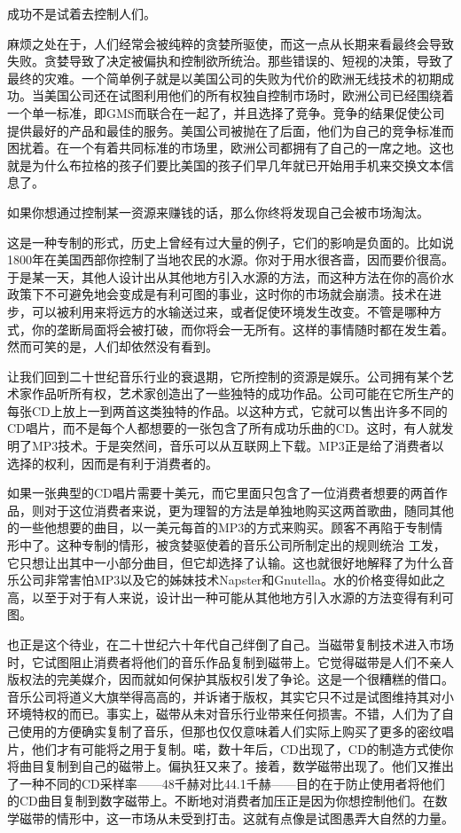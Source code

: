 成功不是试着去控制人们。

麻烦之处在于，人们经常会被纯粹的贪婪所驱使，而这一点从长期来看最终会导致失败。贪婪导致了决定被偏执和控制欲所统治。那些错误的、短视的决策，导致了最终的灾难。一个简单例子就是以美国公司的失败为代价的欧洲无线技术的初期成功。当美国公司还在试图利用他们的所有权独自控制市场时，欧洲公司已经围绕着一个单一标准，即GMS而联合在一起了，并且选择了竞争。竞争的结果促使公司提供最好的产品和最佳的服务。美国公司被抛在了后面，他们为自己的竞争标准而困扰着。在一个有着共同标准的市场里，欧洲公司都拥有了自己的一席之地。这也就是为什么布拉格的孩子们要比美国的孩子们早几年就已开始用手机来交换文本信息了。

如果你想通过控制某一资源来赚钱的话，那么你终将发现自己会被市场淘汰。

这是一种专制的形式，历史上曾经有过大量的例子，它们的影响是负面的。比如说1800年在美国西部你控制了当地农民的水源。你对于用水很吝啬，因而要价很高。于是某一天，其他人设计出从其他地方引入水源的方法，而这种方法在你的高价水政策下不可避免地会变成是有利可图的事业，这时你的市场就会崩溃。技术在进步，可以被利用来将远方的水输送过来，或者促使环境发生改变。不管是哪种方式，你的垄断局面将会被打破，而你将会一无所有。这样的事情随时都在发生着。然而可笑的是，人们却依然没有看到。

让我们回到二十世纪音乐行业的衰退期，它所控制的资源是娱乐。公司拥有某个艺术家作品听所有权，艺术家创造出了一些独特的成功作品。公司可能在它所生产的每张CD上放上一到两首这类独特的作品。以这种方式，它就可以售出许多不同的CD唱片，而不是每个人都想要的一张包含了所有成功乐曲的CD。这时，有人就发明了MP3技术。于是突然间，音乐可以从互联网上下载。MP3正是给了消费者以选择的权利，因而是有利于消费者的。

如果一张典型的CD唱片需要十美元，而它里面只包含了一位消费者想要的两首作品，则对于这位消费者来说，更为理智的方法是单独地购买这两首歌曲，随同其他的一些他想要的曲目，以一美元每首的MP3的方式来购买。顾客不再陷于专制情形中了。这种专制的情形，被贪婪驱使着的音乐公司所制定出的规则统治 工发，它只想让出其中一小部分曲目，但它却选择了认输。这也就很好地解释了为什么音乐公司非常害怕MP3以及它的姊妹技术Napster和Gnutella。水的价格变得如此之高，以至于对于有人来说，设计出一种可能从其他地方引入水源的方法变得有利可图。

也正是这个待业，在二十世纪六十年代自己绊倒了自己。当磁带复制技术进入市场时，它试图阻止消费者将他们的音乐作品复制到磁带上。它觉得磁带是人们不亲人版权法的完美媒介，因而就如何保护其版权引发了争论。这是一个很糟糕的借口。音乐公司将道义大旗举得高高的，并诉诸于版权，其实它只不过是试图维持其对小环境特权的而已。事实上，磁带从未对音乐行业带来任何损害。不错，人们为了自己使用的方便确实复制了音乐，但那也仅仅意味着人们实际上购买了更多的密纹唱片，他们才有可能将之用于复制。喏，数十年后，CD出现了，CD的制造方式使你将曲目复制到自己的磁带上。偏执狂又来了。接着，数学磁带出现了。他们又推出了一种不同的CD采样率——48千赫对比44.1千赫——目的在于防止使用者将他们的CD曲目复制到数字磁带上。不断地对消费者加压正是因为你想控制他们。在数学磁带的情形中，这一市场从未受到打击。这就有点像是试图愚弄大自然的力量。

